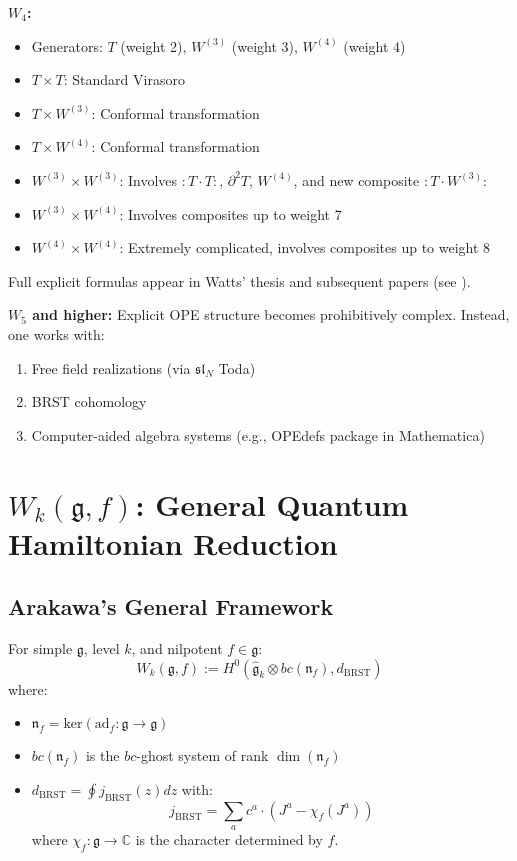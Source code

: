 \begin{remark}
\textbf{$W_4$:}
\begin{itemize}
\item Generators: $T$ (weight 2), $W^{(3)}$ (weight 3), $W^{(4)}$ (weight 4)
\item $T \times T$: Standard Virasoro
\item $T \times W^{(3)}$: Conformal transformation
\item $T \times W^{(4)}$: Conformal transformation
\item $W^{(3)} \times W^{(3)}$: Involves $: T \cdot T :$, $\partial^2 T$, $W^{(4)}$, and new composite $: T \cdot W^{(3)} :$
\item $W^{(3)} \times W^{(4)}$: Involves composites up to weight 7
\item $W^{(4)} \times W^{(4)}$: Extremely complicated, involves composites up to weight 8
\end{itemize}

Full explicit formulas appear in Watts' thesis and subsequent papers (see \cite{Watts-W4}).

\textbf{$W_5$ and higher:}
Explicit OPE structure becomes prohibitively complex. Instead, one works with:
\begin{enumerate}
\item Free field realizations (via $\mathfrak{sl}_N$ Toda)
\item BRST cohomology
\item Computer-aided algebra systems (e.g., OPEdefs package in Mathematica)
\end{enumerate}
\end{remark}

\section{$W_k(\mathfrak{g}, f)$: General Quantum Hamiltonian Reduction}

\subsection{Arakawa's General Framework}

\begin{definition}
\label{def:qhr-general}
For simple $\mathfrak{g}$, level $k$, and nilpotent $f \in \mathfrak{g}$:
$$W_k(\mathfrak{g}, f) := H^0\left(\widehat{\mathfrak{g}}_k \otimes bc(\mathfrak{n}_f), d_{\text{BRST}}\right)$$
where:
\begin{itemize}
\item $\mathfrak{n}_f = \text{ker}(\text{ad}_f: \mathfrak{g} \to \mathfrak{g})$
\item $bc(\mathfrak{n}_f)$ is the $bc$-ghost system of rank $\dim(\mathfrak{n}_f)$
\item $d_{\text{BRST}} = \oint j_{\text{BRST}}(z) dz$ with:
$$j_{\text{BRST}} = \sum_{a} c^a \cdot (J^a - \chi_f(J^a))$$
where $\chi_f: \mathfrak{g} \to \mathbb{C}$ is the character determined by $f$.
\end{itemize}
\end{definition}

